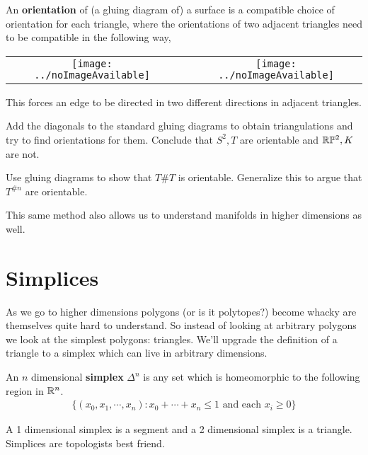 An \textbf{orientation} of (a gluing diagram of) a surface is a compatible choice of orientation for each triangle, where the orientations of two adjacent triangles need to be compatible in the following way,
\begin{center}
	\begin{tabular}{c c c}
		\centering \texttt{[image: ../noImageAvailable]} & \: & \centering \texttt{[image: ../noImageAvailable]}
	\end{tabular}
\end{center}
This forces an edge to be directed in two different directions in adjacent triangles.

\begin{exercise}
	Add the diagonals to the standard gluing diagrams to obtain triangulations and try to find orientations for them. Conclude that $S^2,T$ are orientable and $\mathbb{R}\mathbb{P}^2,K$ are not.
\end{exercise}

\begin{exercise}
	Use gluing diagrams to show that $T\#T$ is orientable. Generalize this to argue that $T ^{\# n}$ are orientable.
\end{exercise}

This same method also allows us to understand manifolds in higher dimensions as well.







\section{Simplices}
As we go to higher dimensions polygons (or is it polytopes?) become whacky are themselves quite hard to understand. So instead of looking at arbitrary polygons we look at the simplest polygons: triangles. We'll upgrade the definition of a triangle to a simplex which can live in arbitrary dimensions.

\begin{definition}
	An $n$ dimensional \textbf{simplex} $\Delta^n$ is any set which is homeomorphic to the following region in $\mathbb{R}^{n}$.
	\begin{align}
		\{ (x_0, x_1, \cdots, x_n) : x_0 + \cdots + x_n \le 1 \mbox{ and each } x_i \ge 0  \}
	\end{align}
\end{definition}
A 1 dimensional simplex is a segment and a 2 dimensional simplex is a triangle.
Simplices are topologists best friend.

